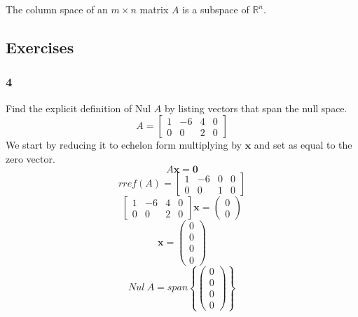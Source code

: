       \begin{theorem}\label{theorem: column space}
        The column space of an $ m × n $ matrix $ A $ is a subspace of $ \mathbb R^{n} $. 
      \end{theorem}

    \subsection*{Exercises}
      \subsubsection*{4}
        Find the explicit definition of Nul $ A $ by listing vectors that span the null space. 
        \[
        A = \begin{bmatrix}
          1 & -6 & 4 & 0\\ 
          0 & 0 & 2 & 0
        \end{bmatrix}
        \]
        We start by reducing it to echelon form multiplying by $ \mathbf x $ and set as equal to the zero vector. 
        \[
        A \mathbf x = \mathbf 0
        \]
        \[
        rref(A) = \begin{bmatrix}
          1 & -6 & 0 & 0\\ 
          0 & 0 & 1 & 0
        \end{bmatrix}
        \]
        \[
          \begin{bmatrix}
            1 & -6 & 4 & 0\\ 
            0 & 0 & 2 & 0
          \end{bmatrix} 
          \mathbf x = 
          \begin{pmatrix}
             0  \\ 
             0 
          \end{pmatrix}
        \]
        \[
        \mathbf x = \begin{pmatrix}
           0  \\ 
           0  \\ 
           0  \\
           0  
        \end{pmatrix}
        \]
        \[
        Nul \ A = span \left\{\begin{pmatrix}
          0  \\ 
          0  \\ 
          0  \\
          0  
       \end{pmatrix}\right\}_{}^{} 
        \]
    
